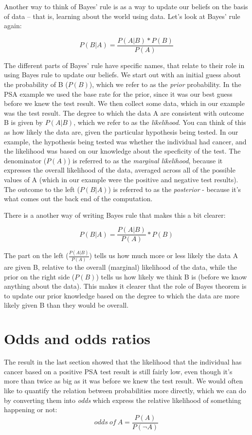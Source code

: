 \documentclass[]{book}
\theoremstyle{definition}
\theoremstyle{definition}
\theoremstyle{definition}
\theoremstyle{remark}
\begin{document}
Another way to think of Bayes' rule is as a way to update our beliefs on
the basis of data -- that is, learning about the world using data. Let's
look at Bayes' rule again:

\[
P(B|A) =  \frac{P(A|B)*P(B)}{P(A)}
\]

The different parts of Bayes' rule have specific names, that relate to
their role in using Bayes rule to update our beliefs. We start out with
an initial guess about the probability of B (\(P(B)\)), which we refer
to as the \emph{prior} probability. In the PSA example we used the base
rate for the prior, since it was our best guess before we knew the test
result. We then collect some data, which in our example was the test
result. The degree to which the data A are consistent with outcome B is
given by \(P(A|B)\), which we refer to as the \emph{likelihood}. You can
think of this as how likely the data are, given the particular
hypothesis being tested. In our example, the hypothesis being tested was
whether the individual had cancer, and the likelihood was based on our
knowledge about the specficity of the test. The denominator (\(P(A)\))
is referred to as the \emph{marginal likelihood}, because it expresses
the overall likelihood of the data, averaged across all of the possible
values of A (which in our example were the positive and negative test
results). The outcome to the left (\(P(B|A)\)) is referred to as the
\emph{posterior} - because it's what comes out the back end of the
computation.

There is a another way of writing Bayes rule that makes this a bit
clearer:

\[
P(B|A) = \frac{P(A|B)}{P(A)}*P(B)
\]

The part on the left (\(\frac{P(A|B)}{P(A)}\)) tells us how much more or
less likely the data A are given B, relative to the overall (marginal)
likelihood of the data, while the prior on the right side (\(P(B)\))
tells us how likely we think B is (before we know anything about the
data). This makes it clearer that the role of Bayes theorem is to update
our prior knowledge based on the degree to which the data are more
likely given B than they would be overall.

\section{Odds and odds ratios}\label{odds-and-odds-ratios}

The result in the last section showed that the likelihood that the
individual has cancer based on a positive PSA test result is still
fairly low, even though it's more than twice as big as it was before we
knew the test result. We would often like to quantify the relation
between probabilities more directly, which we can do by converting them
into \emph{odds} which express the relative likelihood of something
happening or not:\\
\[
odds\ of\ A = \frac{P(A)}{P(\neg A)}
\]
\end{document}
